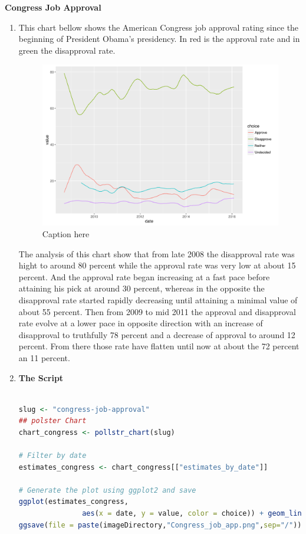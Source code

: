 \documentclass{article}[14pt]
\begin{document}
\begin{section}
{\bf \large Congress Job Approval}
\begin{enumerate}[]
\item {} %

This chart bellow shows the American Congress job approval rating since the beginning of President Obama's presidency. In red is the approval rate and in green the disapproval rate.

\begin{figure}[htb]
\begin{center}
\includegraphics[width=\linewidth]{Congress_job_app.png}
\end{center}
\caption{Caption here}
\label{fig:figure 5}
\end{figure}

The analysis of this chart show that from late 2008 the disapproval rate was hight to around 80 percent while the approval rate was very low at about 15 percent. And the approval rate began increasing at a fast pace before attaining his pick at around 30 percent, whereas in the opposite  the disapproval rate started  rapidly decreasing  until attaining a minimal  value of about 55 percent. Then from  2009 to mid 2011 the approval and disapproval rate evolve at a lower pace in opposite direction with an increase of disapproval to truthfully 78 percent and a decrease of approval to around 12 percent. From there those rate have flatten until  now at about the 72 percent an 11 percent.

\item {\large {\bf The Script}}
\begin{lstlisting}[language = R]

slug <- "congress-job-approval"
## polster Chart
chart_congress <- pollstr_chart(slug)

# Filter by date
estimates_congress <- chart_congress[["estimates_by_date"]]

# Generate the plot using ggplot2 and save
ggplot(estimates_congress, 
               aes(x = date, y = value, color = choice)) + geom_line()
ggsave(file = paste(imageDirectory,"Congress_job_app.png",sep="/"))

\end{lstlisting}
\end{enumerate}

\end{section}
\end{document}

